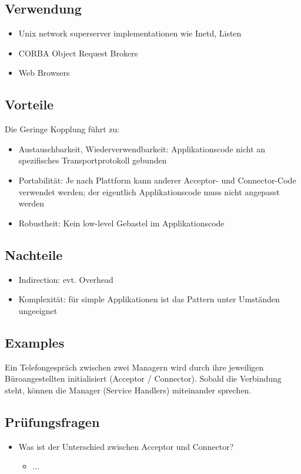\subsection{Verwendung}
\begin{itemize}
	\item Unix network superserver implementationen wie Inetd, Listen
	\item CORBA Object Request Brokers
	\item Web Browsers
\end{itemize}

\subsection{Vorteile}

Die Geringe Kopplung führt zu:
\begin{itemize}
	\item Austauschbarkeit, Wiederverwendbarkeit: Applikationscode nicht an spezifisches Transportprotokoll gebunden
	\item Portabilität: Je nach Plattform kann anderer Acceptor- und Connector-Code verwendet werden; der eigentlich Applikationscode muss nicht angepasst werden
	\item Robustheit: Kein low-level Gebastel im Applikationscode
\end{itemize}


\subsection{Nachteile}
\begin{itemize}
	\item Indirection: evt. Overhead
	\item Komplexität: für simple Applikationen ist das Pattern unter Umständen ungeeignet
\end{itemize}

\subsection{Examples}

Ein Telefongespräch zwischen zwei Managern wird durch ihre jeweiligen Büroangestellten initialisiert (Acceptor / Connector). Sobald die Verbindung steht, können die Manager (Service Handlers) miteinander sprechen.

\subsection{Prüfungsfragen}
\begin{itemize}
	\item Was ist der Unterschied zwischen Acceptor und Connector?
	\begin{itemize}
		\item ...
	\end{itemize}
\end{itemize}

